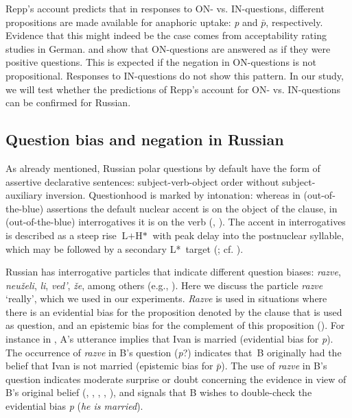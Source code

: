 \documentclass[output=paper,colorlinks,citecolor=brown]{langscibook}
\begin{document}
\ea\label{geist-repp:ex:ON/IN-Question}
\z
\z

\noindent Repp’s account predicts that in responses to ON- vs. IN-questions, different propositions are made available for anaphoric uptake: \textit{p} and $\bar{p}$, respectively. Evidence that this might indeed be the case comes from acceptability rating studies in German. \citet{ClausFruehaufMeijerKrifka2016} and \citet{ReppClausFruehauf} show that ON-questions are answered as if they were positive questions. This is expected if the negation in ON-questions is not propositional. Responses to IN-questions do not show this pattern. In our study, we will test whether the predictions of Repp’s account for ON- vs. IN-questions can be confirmed for Russian.  

\subsection{Question bias and negation in Russian}\label{geist-repp:sec:question-bias-negation}

As already mentioned, Russian polar questions by default have the form of assertive declarative sentences: subject-verb-object order without subject-auxiliary inversion. Questionhood is marked by intonation: whereas in (out-of-the-blue) assertions the default nuclear accent is on the object of the clause, in (out-of-the-blue) interrogatives it is on the verb (\citealt{Bryzgunova1975}, \citealt{Ladd1996}). The accent in interrogatives is described as a steep rise $\text{L}+\text{H*}$ with peak delay into the postnuclear syllable, which may be followed by a secondary L*~target (\citealt{MeyerMleinek2006}; cf. \citealt{Bryzgunova1980}). 

Russian has interrogative particles that indicate different question biases: \textit{razve}, \textit{neuželi}, \textit{li}, \textit{ved’}, \textit{že}, among others (e.g., \citealt[387f.]{Svedova2005}). Here we discuss the particle \textit{razve} ‘really’, which we used in our experiments. \textit{Razve} is used in situations where there is an evidential bias for the proposition denoted by the clause that is used as question, and an epistemic bias for the complement of this proposition (\citealt{ReppGeistToAppear}). For instance in , A’s utterance implies that Ivan is married (evidential bias for \textit{p}). The occurrence of \textit{razve} in B’s question (\textit{p}?) indicates that~B originally had the belief that Ivan is not married (epistemic bias for $\bar{p}$). The use of \textit{razve} in B’s question indicates moderate surprise or doubt concerning the evidence in view of B’s original belief (\citealt{Apresjan1980}, \citealt{Rathmayr1985}, \citealt{Baranov1986}, \citealt{Kirschbaum2001}, \citealt{Matko2014}), and signals that B wishes to double-check the evidential bias \textit{p} (\textit{he is married}). 
\end{document}
